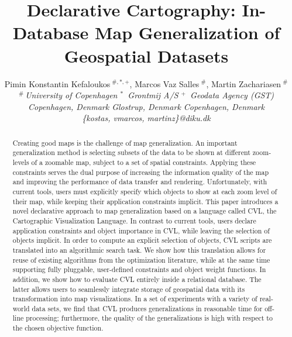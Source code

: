 \documentclass[10pt,conference,letterpaper]{IEEEtran}
\title{Declarative Cartography: In-Database Map Generalization of Geospatial Datasets}
\author{
{Pimin Konstantin Kefaloukos{\small $~^{\#,*,+}$}, Marcos Vaz Salles{\small $~^{\#}$}, Martin Zachariasen{\small $~^{\#}$} }%
\vspace{1.6mm}\\
\fontsize{10}{10}\selectfont\itshape
$^{\#}$\,University of Copenhagen \hspace{3ex} $^{*}$\ Grontmij A/S \hspace{6ex} $^{+}$\ Geodata Agency (GST)         \\
Copenhagen, Denmark \hspace{5ex} Glostrup, Denmark \hspace{6ex} Copenhagen, Denmark\\
\fontsize{9}{9}\selectfont\ttfamily\upshape
\{kostas, vmarcos, martinz\}@diku.dk
}
\begin{document}
\maketitle

\begin{abstract}
Creating good maps is the challenge of map generalization. An important generalization method is selecting subsets of the data to be shown at different zoom-levels of a zoomable map, subject to a set of spatial constraints. Applying these constraints serves the dual purpose of increasing the information quality of the map and improving the performance of data transfer and rendering.
Unfortunately, with current tools, users must explicitly specify which objects to show at each zoom level of their map, while keeping their application constraints implicit. This paper introduces a novel declarative approach to map generalization based on a language called CVL, the Cartographic Visualization Language. In contrast to current tools, users declare application constraints and object importance in CVL, while leaving the selection of objects implicit. In order to compute an explicit selection of objects, CVL scripts are translated into an algorithmic search task. We show how this translation allows for reuse of existing algorithms from the optimization literature, while at the same time supporting fully pluggable, user-defined constraints and object weight functions. In addition, we show how to evaluate CVL entirely inside a relational database. The latter allows users to seamlessly integrate storage of geospatial data with its transformation into map visualizations. In a set of experiments with a variety of real-world data sets, we find that CVL produces generalizations in reasonable time for off-line processing; furthermore, the quality of the generalizations is high with respect to the chosen objective function.
\end{abstract}






















\end{document}
